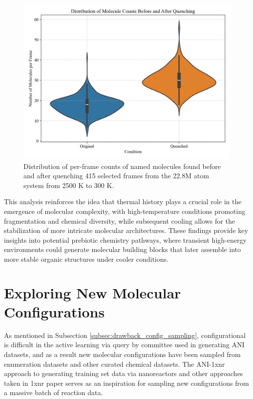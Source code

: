\begin{figure}[!ht]
    \centering
    \includegraphics[width=1\linewidth]{Images/early_earth/violinplot-mol_counts-before-after-quench.png}
    \caption[Violin plot: total named molecules found before and after quenching system]{Distribution of per-frame counts of named molecules found before and after quenching 415 selected frames from the 22.8M atom system from 2500 K to 300 K.}
    \label{fig:ee_quench_violinplot}
\end{figure}

This analysis reinforces the idea that thermal history plays a crucial role in the emergence of molecular complexity, with high-temperature conditions promoting fragmentation and chemical diversity, while subsequent cooling allows for the stabilization of more intricate molecular architectures. These findings provide key insights into potential prebiotic chemistry pathways, where transient high-energy environments could generate molecular building blocks that later assemble into more stable organic structures under cooler conditions.

\section{Exploring New Molecular Configurations}
\label{sec:exploring_new_mol_configs}

As mentioned in Subsection \ref{subsec:drawback_config_sampling}, configurational is difficult in the active learning via query by committee used in generating ANI datasets, and as a result new molecular configurations have been sampled from enumeration datasets and other curated chemical datasets.
The ANI-1xnr \cite{ani-1xnr} approach to generating training set data via nanoreactors and other approaches taken in 1xnr paper serves as an inspiration for sampling new configurations from a massive batch of reaction data.


